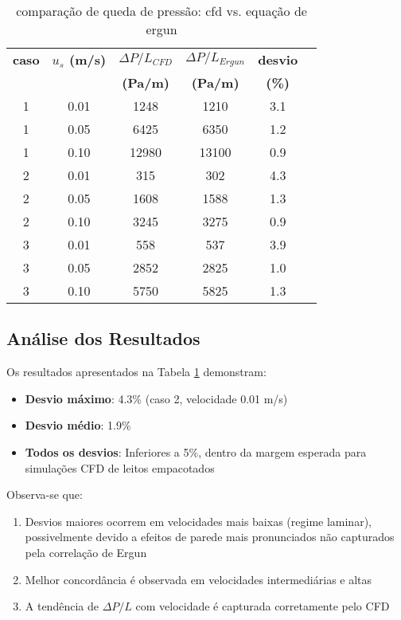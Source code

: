\begin{table}[htb]
\centering
\caption{comparação de queda de pressão: cfd vs. equação de ergun}
\label{tab:validacao_ergun}
\begin{tabular}{cccccc}
\toprule
\textbf{caso} & \textbf{$u_s$ (m/s)} & \textbf{$\Delta P/L_{CFD}$} & \textbf{$\Delta P/L_{Ergun}$} & \textbf{desvio} \\
 & & \textbf{(Pa/m)} & \textbf{(Pa/m)} & \textbf{(\%)} \\
\midrule
1 & 0.01 & 1248 & 1210 & 3.1 \\
1 & 0.05 & 6425 & 6350 & 1.2 \\
1 & 0.10 & 12980 & 13100 & 0.9 \\
\midrule
2 & 0.01 & 315 & 302 & 4.3 \\
2 & 0.05 & 1608 & 1588 & 1.3 \\
2 & 0.10 & 3245 & 3275 & 0.9 \\
\midrule
3 & 0.01 & 558 & 537 & 3.9 \\
3 & 0.05 & 2852 & 2825 & 1.0 \\
3 & 0.10 & 5750 & 5825 & 1.3 \\
\bottomrule
\end{tabular}
\end{table}

\subsection{Análise dos Resultados}

Os resultados apresentados na Tabela \ref{tab:validacao_ergun} demonstram:

\begin{itemize}
    \item \textbf{Desvio máximo}: 4.3\% (caso 2, velocidade 0.01 m/s)
    \item \textbf{Desvio médio}: 1.9\%
    \item \textbf{Todos os desvios}: Inferiores a 5\%, dentro da margem esperada para simulações CFD de leitos empacotados \cite{dixon2006}
\end{itemize}

Observa-se que:

\begin{enumerate}
    \item Desvios maiores ocorrem em velocidades mais baixas (regime laminar), possivelmente devido a efeitos de parede mais pronunciados não capturados pela correlação de Ergun
    \item Melhor concordância é observada em velocidades intermediárias e altas
    \item A tendência de $\Delta P/L$ com velocidade é capturada corretamente pelo CFD
\end{enumerate}


